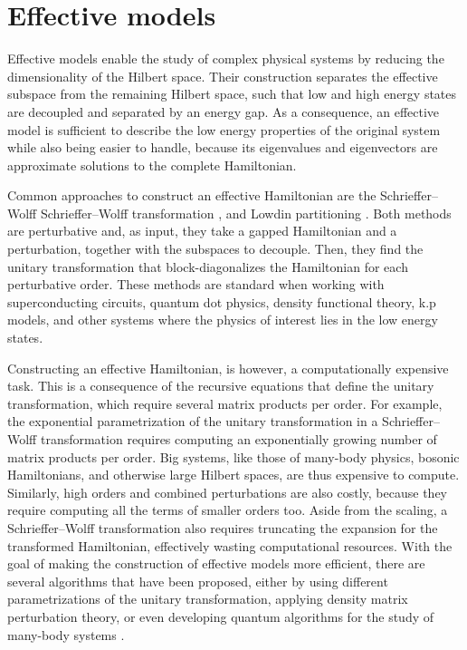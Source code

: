 \section{Effective models}

Effective models enable the study of complex physical systems by reducing the
dimensionality of the Hilbert space.
Their construction separates the effective subspace from the remaining Hilbert
space, such that low and high energy states are decoupled and separated by an
energy gap.
As a consequence, an effective model is sufficient to describe the low energy
properties of the original system while also being easier to handle, because
its eigenvalues and eigenvectors are approximate solutions to the complete
Hamiltonian.

Common approaches to construct an effective Hamiltonian are the Schrieffer--Wolff
Schrieffer--Wolff transformation
\cite{Schrieffer_1966}, \cite{Bravyi_2011}
and Lowdin partitioning \cite{White_1950}.
Both methods are perturbative and, as input, they take a gapped Hamiltonian and
a perturbation, together with the subspaces to decouple.
Then, they find the unitary transformation that block-diagonalizes the
Hamiltonian for each perturbative order.
These methods are standard when working with superconducting circuits,
quantum dot physics, density functional theory, k.p models, and other
systems where the physics of interest lies in the low energy states.

Constructing an effective Hamiltonian, is however, a computationally expensive
task.
This is a consequence of the recursive equations that define the unitary
transformation, which require several matrix products per order.
For example, the exponential parametrization of the unitary
transformation in a Schrieffer--Wolff transformation requires computing
an exponentially growing number of matrix products per order.
Big systems, like those of many-body physics, bosonic Hamiltonians, and
otherwise large Hilbert spaces, are thus expensive to compute.
Similarly, high orders and combined perturbations are also costly, because they
require computing all the terms of smaller orders too.
Aside from the scaling, a Schrieffer--Wolff transformation also requires
truncating the expansion for the transformed Hamiltonian, effectively wasting
computational resources.
With the goal of making the construction of effective models more efficient,
there are several algorithms that have been proposed, either by using different
parametrizations of the unitary transformation, applying density matrix
perturbation theory, or even developing quantum algorithms for the study
of many-body systems \cite{Wurtz_2020, Zhang_2022}.

